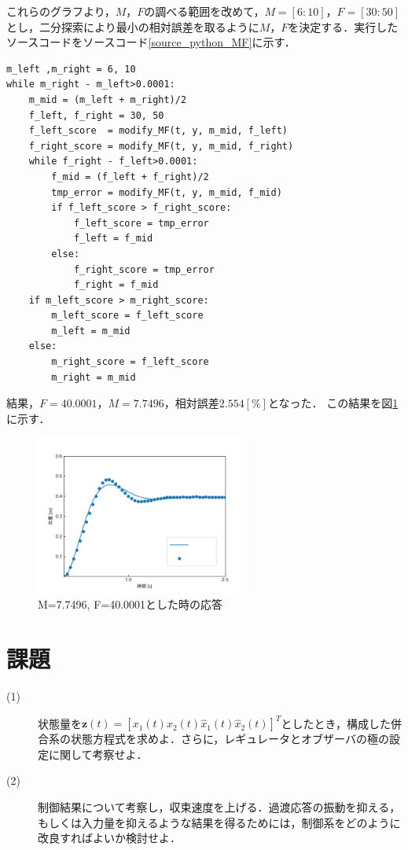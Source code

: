 \documentclass[12pt]{jsarticle}
\begin{document}
これらのグラフより，$M$，$F$の調べる範囲を改めて，$M=[6:10]$，$F=[30:50]$とし，二分探索により最小の相対誤差を取るように$M$，$F$を決定する．実行したソースコードをソースコード\ref{source_python_MF}に示す．
\newpage
\begin{lstlisting}[caption = python code, label = source_python_MF]
m_left ,m_right = 6, 10
while m_right - m_left>0.0001:
	m_mid = (m_left + m_right)/2
	f_left, f_right = 30, 50
	f_left_score  = modify_MF(t, y, m_mid, f_left)
	f_right_score = modify_MF(t, y, m_mid, f_right)
	while f_right - f_left>0.0001:
		f_mid = (f_left + f_right)/2
		tmp_error = modify_MF(t, y, m_mid, f_mid)
		if f_left_score > f_right_score:
			f_left_score = tmp_error
			f_left = f_mid
		else:
			f_right_score = tmp_error
			f_right = f_mid
	if m_left_score > m_right_score:
		m_left_score = f_left_score
		m_left = m_mid
	else:
		m_right_score = f_left_score
		m_right = m_mid
\end{lstlisting}
結果，$F=40.0001$，$M=7.7496$，相対誤差$2.554[\%]$となった．
この結果を図\ref{Figure-modify_MF_doutei}に示す．
\begin{figure}[tb]
  \begin{center}
    \includegraphics[clip,width=7.0cm]{../img/modify_MF_doute.png}
    \caption{M=7.7496, F=40.0001とした時の応答}
    \label{Figure-modify_MF_doutei}
  \end{center}
\end{figure}
\section{課題}
\begin{description}
  \item[(1)] 状態量を${\bm z}(t) = [x_1(t) x_2(t) \hat{x}_1(t) \hat{x}_2(t)]^T$としたとき，構成した併合系の状態方程式を求めよ．さらに，レギュレータとオブザーバの極の設定に関して考察せよ．
  \item[(2)] 制御結果について考察し，収束速度を上げる．過渡応答の振動を抑える，もしくは入力量を抑えるような結果を得るためには，制御系をどのように改良すればよいか検討せよ．
\end{description}
\end{document}
